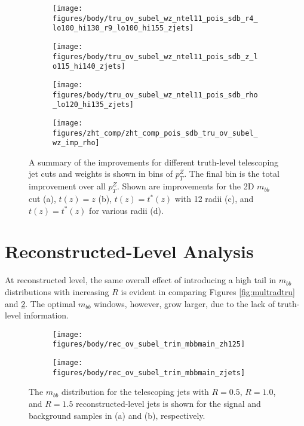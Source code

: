 \begin{figure}[!htbp]\captionsetup{justification=centering}
\begin{center}
\begin{subfigure}[t]{16pc}\centering\texttt{[image: figures/body/tru\_ov\_subel\_wz\_ntel11\_pois\_sdb\_r4\_lo100\_hi130\_r9\_lo100\_hi155\_zjets]}\caption{}\end{subfigure}
\begin{subfigure}[t]{16pc}\centering\texttt{[image: figures/body/tru\_ov\_subel\_wz\_ntel11\_pois\_sdb\_z\_lo115\_hi140\_zjets]}\caption{}\end{subfigure}
\begin{subfigure}[t]{16pc}\centering\texttt{[image: figures/body/tru\_ov\_subel\_wz\_ntel11\_pois\_sdb\_rho\_lo120\_hi135\_zjets]}\caption{}\end{subfigure}
\begin{subfigure}[t]{16pc}\centering\texttt{[image: figures/zht\_comp/zht\_comp\_pois\_sdb\_tru\_ov\_subel\_wz\_imp\_rho]}\caption{}\end{subfigure}
\caption{\label{fig:sigsumtru}A summary of the improvements for different truth-level telescoping jet cuts and weights is shown in bins of $p_T^Z$.  %
  The final bin is the total improvement over all $p_T^Z$.  Shown are improvements for the 2D $m_{bb}$ cut (a), $t\left(z\right)=z$ (b), $t\left(z\right)=t^*\left(z\right)$ with 12 radii (c), and $t\left(z\right)=t^*\left(z\right)$ for various radii (d).}
\end{center}
\end{figure}

\clearpage

\section{Reconstructed-Level Analysis}
\label{sec:rec}
At reconstructed level, the same overall effect of introducing a high tail in $m_{bb}$ distributions with increasing $R$ is evident in comparing Figures \ref{fig:multradtru} and \ref{fig:multradrec}.  The optimal $m_{bb}$ windows, however, grow larger, due to the lack of truth-level information.

\begin{figure}[!htbp]\captionsetup{justification=centering}
\begin{center}
\begin{subfigure}[t]{18pc}\centering\texttt{[image: figures/body/rec\_ov\_subel\_trim\_mbbmain\_zh125]}\caption{}\end{subfigure}
\begin{subfigure}[t]{18pc}\centering\texttt{[image: figures/body/rec\_ov\_subel\_trim\_mbbmain\_zjets]}\caption{}\end{subfigure}
\caption{\label{fig:multradrec}The $m_{bb}$ distribution for the telescoping jets with $R=0.5$, $R=1.0$, and $R=1.5$ reconstructed-level jets is shown for the signal and background samples in (a) and (b), respectively.}
\end{center}
\end{figure}

